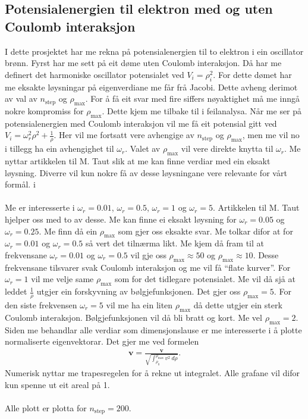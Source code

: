 \documentclass[11pt, a4paper]{article}
\begin{document}
  \subsection{Potensialenergien til elektron med og uten Coulomb interaksjon}
    I dette prosjektet har me rekna på potensialenergien til to elektron i ein oscillator brønn. Fyrst har me sett på eit døme uten Coulomb interaksjon. Då har me definert 
    det harmoniske oscillator potensialet ved $V_i = \rho_i^2$. For dette dømet har me eksakte løysningar på eigenverdiane me får frå Jacobi. Dette avheng derimot av val 
    av $n_{\text{step}}$ og $\rho_{\text{max}}$. For å få eit svar med fire siffers nøyaktighet må me inngå nokre kompromiss for $\rho_{\text{max}}$. Dette kjem me tilbake 
    til i feilanalysa. Når me ser på potensialenergien med Coulomb interaksjon vil me få eit potensial gitt ved $V_i = \omega_r^2\rho^2 + \frac{1}{\rho}$. Her vil me fortsatt vere 
    avhengige av $n_{\text{step}}$ og $\rho_{\text{max}}$, men me vil no i tillegg ha ein avhengighet til $\omega_r$. Valet av $\rho_{\text{max}}$ vil vere direkte knytta til 
    $\omega_r$. Me nyttar artikkelen til M. Taut slik at me kan finne verdiar med ein eksakt løysning. Diverre vil kun nokre få av desse løysningane vere relevante for vårt formål. i
    \\ \\
    Me er interesserte i $\omega_r = 0.01$, $\omega_r = 0.5$, $\omega_r = 1$ og $\omega_r = 5$. Artikkelen til M. Taut hjelper oss med to av desse. Me kan finne ei eksakt løysning 
    for $\omega_r = 0.05$ og $\omega_r = 0.25$. Me finn då ein $\rho_{\text{max}}$ som gjer oss eksakte svar. Me tolkar difor at for $\omega_r = 0.01$ og $\omega_r = 0.5$ så vert det 
    tilnærma likt. Me kjem då fram til at frekvensane $\omega_r = 0.01$ og $\omega_r = 0.5$ vil gje oss $\rho_{\text{max}} \approx 50$ og $\rho_{\text{max}} \approx 10$. Desse 
    frekvensane tilsvarer svak Coulomb interaksjon og me vil få ``flate kurver''. For $\omega_r = 1$ vil me velje same $\rho_{\text{max}}$ som for det tidlegare potensialet. 
    Me vil då sjå at leddet $\frac{1}{\rho}$ utgjer ein forskyvning av bølgjefunksjonen. Det gjer oss $\rho_{\text{max}} = 5$. For den siste frekvensen $\omega_r = 5$ vil me ha ein 
    liten $\rho_{\text{max}}$ då dette utgjer ein sterk Coulomb interaksjon. Bølgjefunksjonen vil då bli bratt og kort. Me vel $\rho_{\text{max}} = 2$. %
    \\
    Siden me behandlar alle verdiar som dimensjonslause er me interesserte i å plotte normaliserte eigenvektorar. Det gjer me ved formelen
    \begin{align*}
      \mathbf{v} = \frac{\mathbf{v}}{\sqrt{\int_{\rho_0}^{\rho_{\text{max}}}{v^2 \ d\rho}}}.
    \end{align*}
    Numerisk nyttar me trapesregelen for å rekne ut integralet. Alle grafane vil difor kun spenne ut eit areal på 1. \\ \\
    Alle plott er plotta for $n_{\text{step}} = 200$.
\end{document}
